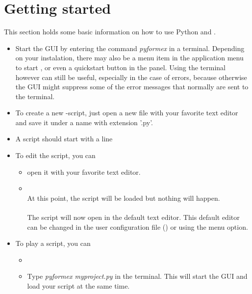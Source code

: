 \section{Getting started}
\label{sec:getting-started}

\outdated


This section holds some basic information on how to use Python and \pyformex. 

\begin{itemize}
\item Start the \pyformex GUI by entering the command \emph{pyformex} in a terminal. Depending on your instalation, there may also be a menu item in the application menu to start \pyf, or even a quickstart button in the panel. Using the terminal however can still be useful, especially in the case of errors, because otherwise the GUI might suppress some of the error messages that normally are sent to the terminal.
\item To create a new \pyformex-script, just open a new file with your favorite text editor and save it under a name with extension '.py'.
\item A \pyf script should start with a line 
\item To edit the script, you can
	\begin{itemize}
	\item open it with your favorite text editor.
	\item {}\\
	At this point, the script will be loaded but nothing will happen. \\
	\\
	The script will now open in the default text editor. This default editor can be changed in the user configuration file () or using the  menu option.
	\end{itemize}
\item To play a script, you can
	\begin{itemize}
	\item {}\\
	\item Type \emph{pyformex myproject.py} in the terminal. This will start the \pyformex GUI and load your script at the same time. \\

\end{itemize}
\end{itemize}
